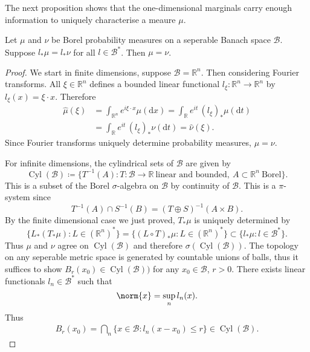 \documentclass[fontsize=12pt, DIV=10]{scrreprt}
\theoremstyle{remark}
\newcommand{\defeq}{\coloneqq}
\newcommand{\R}{\mathbb R}
\newcommand{\calB}{\mathcal B}
\newcommand{\dif}[1]{\text{d} #1}
\DeclareMathOperator{\cyl}{Cyl}
\begin{document}
The next proposition shows that the one-dimensional marginals carry enough information to uniquely characterise a meaure $\mu$.
\begin{prop}
	\label{prop:one-dim-marginals}
	Let $\mu$ and $\nu$ be Borel probability measures on a seperable Banach space $\calB$. Suppose $l_* \mu = l_* \nu$ for all $l \in \calB^*$. Then $\mu = \nu$.
\end{prop}
\begin{proof}
	We start in finite dimensions, suppose $\calB = \R^n$. Then considering Fourier transforms. All $\xi \in \R^n$ defines a bounded linear functional $l_{\xi}: \R^n \to \R^n$ by $l_{\xi}(x) = \xi \cdot x$. Therefore
	\begin{align}
		\hat{\mu}(\xi)
		&= \int_{\R^n} e^{i \xi \cdot x} \mu(\dif x)
		= \int_{\R} e^{i t} \, (l_{\xi})_*\mu(\dif t) \\
		&= \int_{\R} e^{i t} \, (l_{\xi})_*\nu(\dif t)
		= \hat{\nu}(\xi).
	\end{align}
	Since Fourier transforms uniquely determine probability measures, $\mu = \nu$.
	
	For infinite dimensions, the cylindrical sets of $\calB$ are given by
	\begin{equation}
		\cyl(\calB) \defeq \{T^{-1}(A) : T: \calB \to \R\ \text{linear and bounded},\ A \subset \R^n\ \text{Borel}\}.
	\end{equation}
	This is a subset of the Borel $\sigma$-algebra on $\calB$ by continuity of $\calB$. This is a $\pi$-system since 
	\begin{equation}
		T^{-1}(A) \cap S^{-1}(B) = (T \oplus S)^{-1}(A \times B).
	\end{equation}
	By the finite dimensional case we just proved, $T_* \mu$ is uniquely determined by
	\begin{equation}
		\{L_*(T_* \mu) : L \in (\R^n)^* \} = \{ (L \circ T)_* \mu : L \in (\R^n)^* \}
		\subset \{l_* \mu : l \in \calB^*\}.
	\end{equation}
	Thus $\mu$ and $\nu$ agree on $\cyl(\calB)$ and therefore $\sigma(\cyl(\calB))$. The topology on any seperable metric space is generated by countable unions of balls, thus it suffices to show $B_r(x_0) \in \cyl(\calB))$ for any $x_0 \in \calB$, $r > 0$. There exists linear functionals $l_n \in \calB^*$ such that 
	\begin{equation}
		\norm{x} = \sup_n l_n(x).
	\end{equation}
	Thus
	\begin{align}
		B_r(x_0) = \bigcap_n \{x \in \calB : l_n(x - x_0) \leq r \} \in \cyl(\calB).
	\end{align}
\end{proof}
\end{document}

